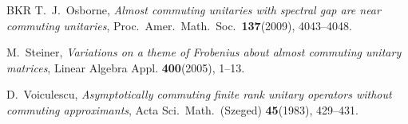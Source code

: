 \documentclass[10pt]{amsart}
\theoremstyle{definition}
\begin{document}
\begin{thebibliography}{BKR}
 T.~J.\  Osborne,
{\emph{Almost commuting unitaries with spectral gap are near commuting
  unitaries}},
Proc.\  Amer.\  Math.\  Soc.\  {\textbf{137}}(2009), 4043--4048.

 M.~Steiner,
{\emph{Variations on a theme of Frobenius about almost commuting unitary
  matrices}},
Linear Algebra Appl. {\textbf{400}}(2005), 1--13.

 D.~Voiculescu,
{\emph{Asymptotically commuting finite rank unitary operators
without commuting approximants}},
Acta Sci.\  Math.\  (Szeged) {\textbf{45}}(1983),  429--431.

\end{thebibliography}
\end{document}

